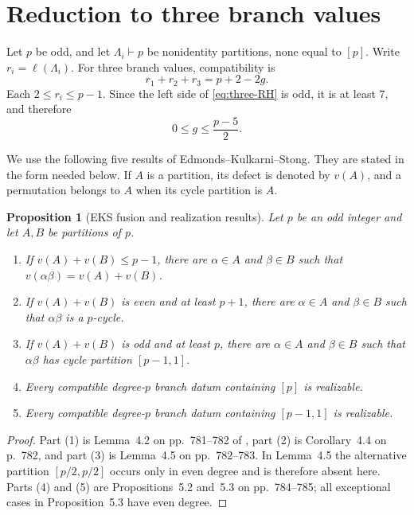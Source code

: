 \documentclass[11pt]{amsart}
\theoremstyle{plain}
\newtheorem{proposition}[theorem]{Proposition}
\theoremstyle{definition}
\newcommand{\length}{\ell}
\numberwithin{equation}{section}
\begin{document}
\section{Reduction to three branch values}\label{sec:EKS-reduction}

Let $p$ be odd, and let $\Lambda_i\vdash p$ be nonidentity partitions,
none equal to $[p]$.  Write $r_i=\length(\Lambda_i)$.  For three branch
values, compatibility is
\begin{equation}\label{eq:three-RH}
 r_1+r_2+r_3=p+2-2g.
\end{equation}
Each $2\leq r_i\leq p-1$.  Since the left side of
\eqref{eq:three-RH} is odd, it is at least $7$, and therefore
\begin{equation}\label{eq:genus-bound}
 0\leq g\leq \frac{p-5}{2}.
\end{equation}

We use the following five results of Edmonds--Kulkarni--Stong.  They are
stated in the form needed below.  If $A$ is a partition, its defect is
denoted by $v(A)$, and a permutation belongs to $A$ when its cycle partition
is $A$.

\begin{proposition}[EKS fusion and realization results]
\label{prop:EKS-inputs}
Let $p$ be an odd integer and let $A,B$ be partitions of $p$.
\begin{enumerate}
\item If $v(A)+v(B)\leq p-1$, there are $\alpha\in A$ and
$\beta\in B$ such that $v(\alpha\beta)=v(A)+v(B)$.
\item If $v(A)+v(B)$ is even and at least $p+1$, there are
$\alpha\in A$ and $\beta\in B$ such that $\alpha\beta$ is a $p$-cycle.
\item If $v(A)+v(B)$ is odd and at least $p$, there are
$\alpha\in A$ and $\beta\in B$ such that $\alpha\beta$ has cycle
partition $[p-1,1]$.
\item Every compatible degree-$p$ branch datum containing $[p]$ is
realizable.
\item Every compatible degree-$p$ branch datum containing $[p-1,1]$ is
realizable.
\end{enumerate}
\end{proposition}

\begin{proof}
Part (1) is Lemma~4.2 on pp.~781--782 of \cite{EKS}, part (2) is
Corollary~4.4 on p.~782, and part (3) is Lemma~4.5 on pp.~782--783.  In
Lemma~4.5 the alternative partition
$[p/2,p/2]$ occurs only in even degree and is therefore absent here.
Parts (4) and (5) are Propositions~5.2 and~5.3 on pp.~784--785; all
exceptional cases in Proposition~5.3 have even degree.
\end{proof}
\end{document}
